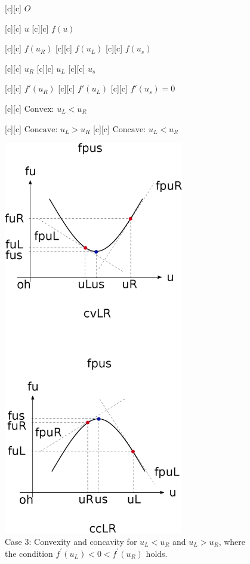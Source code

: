 \begin{figure}[ht]
	\centering
	\footnotesize

	[c] {$O$}

	[c] {$u$}
	[c] {$f(u)$}

	[c] {$f(u_{R})$}
	[c] {$f(u_{L})$}
	[c] {$f(u_{s})$}

	[c] {$u_{R}$}
	[c] {$u_{L}$}
	[c] {$u_{s}$}

	[c] {$f'(u_{R})$}
	[c] {$f'(u_{L})$}
	[c] {$f'(u_{s}) = 0$}

	[c] {$\text{Convex: } u_{L} < u_{R}$}

	[c] {$\text{Concave: } u_{L} > u_{R}$}
	[c] {$\text{Concave: } u_{L} < u_{R}$}

	\includegraphics[width=0.7\textwidth]{convexityfu_case3.eps}
	\caption{Case 3:
		Convexity and concavity for $u_{L} < u_{R}$ and $u_{L} > u_{R}$,
		where the condition $f^\prime(u_L) < 0 <  f^\prime(u_R)$ holds.}
	\label{\LABEL}
\end{figure}
